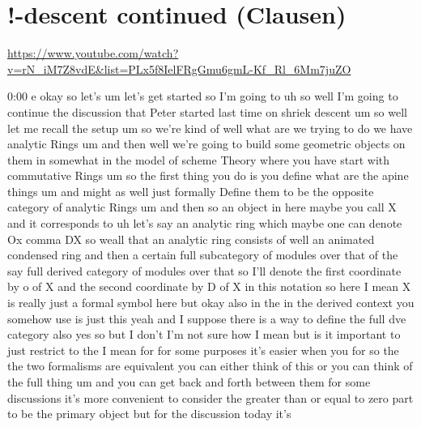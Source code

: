 
\section{\ufs !-descent continued (Clausen)}

\url{https://www.youtube.com/watch?v=rN_iM7Z8vdE&list=PLx5f8IelFRgGmu6gmL-Kf_Rl_6Mm7juZO}
\renewcommand{\yt}[2]{\href{https://www.youtube.com/watch?v=rN_iM7Z8vdE&list=PLx5f8IelFRgGmu6gmL-Kf_Rl_6Mm7juZO&t=#1}{#2}}
\vspace{1em}

\begin{unfinished}{0:00}
e
okay  so  let's  um  let's  get  started  so
I'm  going  to  uh  so  well  I'm  going  to
continue  the  discussion  that  Peter
started  last  time  on  shriek
descent
um  so  well  let  me  recall  the
setup  um  so  we're  kind  of  well  what  are
we  trying  to  do  we  have  analytic  Rings
um
and  then
well  we're  going  to  build  some  geometric
objects  on  them  in  somewhat  in  the  model
of  scheme  Theory  where  you  have  start
with  commutative  Rings  um  so  the  first
thing  you  do  is  you  define  what  are  the
apine  things  um  and  might  as  well  just
formally  Define  them  to  be  the  opposite
category  of  analytic
Rings  um  and  then  so  an  object  in  here
maybe  you  call  X  and  it  corresponds  to
uh  let's  say  an  analytic  ring  which
maybe  one  can  denote  Ox  comma  DX  so
weall  that  an  analytic  ring  consists  of
well  an  animated  condensed  ring  and  then
a  certain  full  subcategory  of  modules
over  that  of  the  say  full  derived
category  of  modules  over  that  so  I'll
denote  the  first  coordinate  by  o  of  X
and  the  second  coordinate  by  D  of  X  in
this  notation  so  here  I  mean  X  is  really
just  a  formal  symbol  here  but  okay  also
in  the  in  the  derived  context  you
somehow  use
is  just  this  yeah  and  I  suppose  there  is
a  way  to  define  the  full  dve  category
also  yes  so  but  I  don't  I'm  not  sure  how
I  mean  but  is  it  important  to  just
restrict  to  the  I
mean
for  for  some  purposes  it's  easier  when
you  for  so  the  the  two  formalisms  are
equivalent  you  can  either  think  of  this
or  you  can  think  of  the  full  thing  um
and  you  can  get  back  and  forth  between
them  for  some  discussions  it's  more
convenient  to  consider  the  greater  than
or  equal  to  zero  part  to  be  the  primary
object  but  for  the  discussion  today  it's

\end{unfinished}
